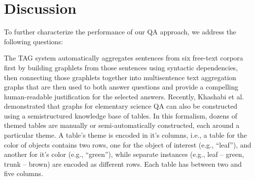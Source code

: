 \section{Discussion}
\label{sec:discussion}

To further characterize the performance of our QA approach, we address the following questions: 


%

{} The TAG system automatically aggregates sentences from six free-text corpora first by building graphlets from those sentences using syntactic dependencies, then connecting those graphlets together into multisentence text aggregation graphs that are then used to both answer questions and provide a compelling human-readable justification for the selected answers.  Recently, Khashabi et al. \citeyear{Khashabi2016QuestionAV} demonstrated that graphs for elementary science QA can also be constructed using a semistructured knowledge base of tables.  In this formalism, dozens of themed tables are manually or semi-automatically constructed, each around a particular theme.  A table's theme is encoded in it's columns, i.e., a table for the color of objects contains two rows, one for the object of interest (e.g., ``leaf''), and another for it's color (e.g., ``green''), while separate instances (e.g., leaf -- green, trunk -- brown) are encoded as different rows.  Each table has between two and five columns.  

